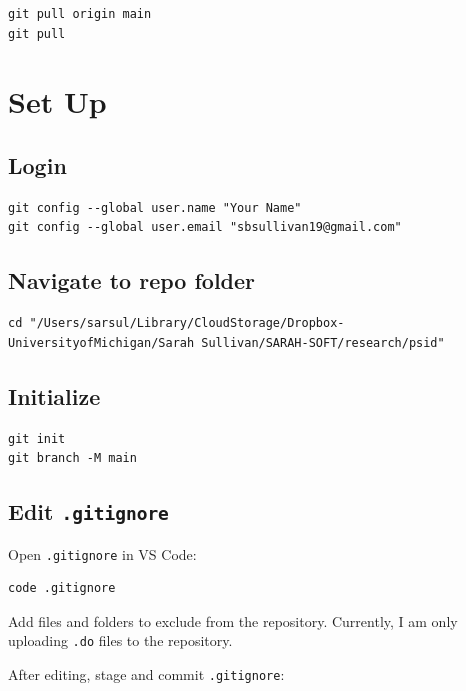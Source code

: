 \documentclass[11pt]{article}
\begin{document}
\begin{lstlisting}[style=bash]
git pull origin main
git pull
\end{lstlisting}

\section{Set Up}

\subsection{Login}

\begin{lstlisting}[style=bash]
git config --global user.name "Your Name"
git config --global user.email "sbsullivan19@gmail.com"
\end{lstlisting}

\subsection{Navigate to repo folder}

\begin{lstlisting}[style=bash]
cd "/Users/sarsul/Library/CloudStorage/Dropbox-UniversityofMichigan/Sarah Sullivan/SARAH-SOFT/research/psid"
\end{lstlisting}

\subsection{Initialize}

\begin{lstlisting}[style=bash]
git init
git branch -M main
\end{lstlisting}

\subsection{Edit \texttt{.gitignore}}

Open \texttt{.gitignore} in VS Code:

\begin{lstlisting}[style=bash]
code .gitignore
\end{lstlisting}

Add files and folders to exclude from the repository. Currently, I am only uploading \texttt{.do} files to the repository.

After editing, stage and commit \texttt{.gitignore}:
\end{document}
